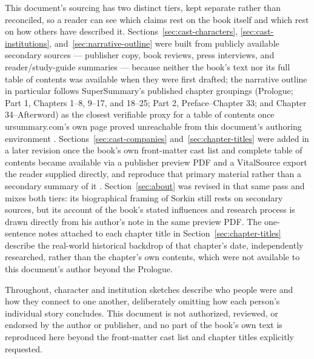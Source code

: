 \documentclass[11pt]{article}
\begin{document}
This document's sourcing has two distinct tiers, kept separate rather than
reconciled, so a reader can see which claims rest on the book itself and which
rest on how others have described it. Sections~\ref{sec:cast-characters},
\ref{sec:cast-institutions}, and~\ref{sec:narrative-outline} were built from
publicly available secondary sources --- publisher copy, book reviews, press
interviews, and reader/study-guide summaries --- because neither the book's
text nor its full table of contents was available when they were first
drafted; the narrative outline in particular follows SuperSummary's published
chapter groupings (Prologue; Part 1, Chapters 1--8, 9--17, and 18--25; Part 2,
Preface--Chapter 33; and Chapter 34--Afterword) as the closest verifiable proxy
for a table of contents once ursummary.com's own page proved unreachable from
this document's authoring environment \autocite{ursummaryChapters1929}.
Sections~\ref{sec:cast-companies} and~\ref{sec:chapter-titles} were added in a
later revision once the book's own front-matter cast list and complete
table of contents became available via a publisher preview PDF and a
VitalSource export the reader supplied directly, and reproduce that primary
material rather than a secondary summary of it
\autocite{sorkinPreviewPDF,vitalsource1929}. Section~\ref{sec:about} was
revised in that same pass and mixes both tiers: its biographical framing of
Sorkin still rests on secondary sources, but its account of the book's stated
influences and research process is drawn directly from his author's note in
the same preview PDF. The one-sentence notes attached
to each chapter title in Section~\ref{sec:chapter-titles} describe the
real-world historical backdrop of that chapter's date, independently
researched, rather than the chapter's own contents, which were not available
to this document's author beyond the Prologue.

Throughout, character and institution sketches describe who people were and
how they connect to one another, deliberately omitting how each person's
individual story concludes. This document is not authorized, reviewed, or
endorsed by the author or publisher, and no part of the book's own text is
reproduced here beyond the front-matter cast list and chapter titles
explicitly requested.

\printbibliography[title={References}]
\end{document}
